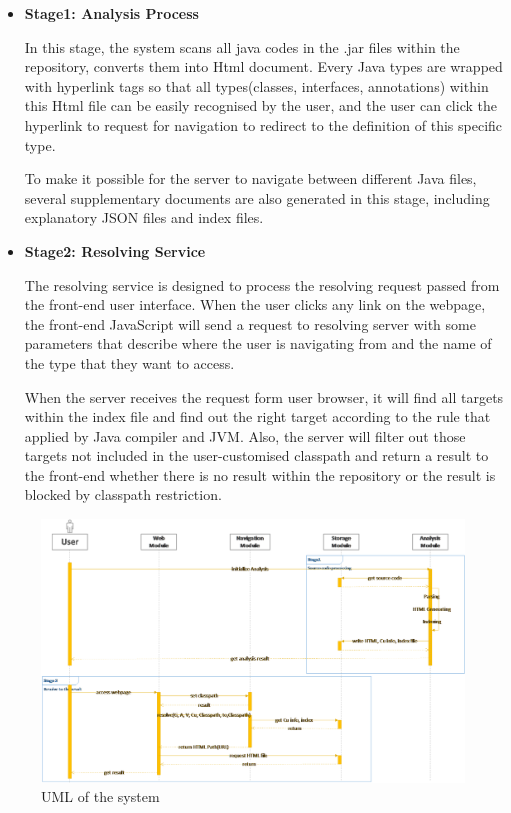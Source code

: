\documentclass[runningheads]{llncs}
\begin{document}
\begin{itemize}
	\item \textbf{Stage1: Analysis Process}

	In this stage, the system scans all java codes in the .jar files within the repository, converts them into Html document. Every Java types are wrapped with hyperlink tags so that all types(classes, interfaces, annotations) within this Html file can be easily recognised by the user, and the user can click the hyperlink to request for navigation to redirect to the definition of this specific type.

	To make it possible for the server to navigate between different Java files, several supplementary documents are also generated in this stage, including explanatory JSON files and index files.
	

	\item \textbf{Stage2: Resolving Service}

	The resolving service is designed to process the resolving request passed from the front-end user interface. When the user clicks any link on the webpage, the front-end JavaScript will send a request to resolving server with some parameters that describe where the user is navigating from and the name of the type that they want to access.

	When the server receives the request form user browser, it will find all targets within the index file and find out the right target according to the rule that applied by Java compiler and JVM. Also, the server will filter out those targets not included in the user-customised classpath and return a result to the front-end whether there is no result within the repository or the result is blocked by classpath restriction.
\end{itemize}


\begin{figure}[H]
	\centering
	\includegraphics[width=12cm]{pic/system-uml.png}
	\caption{UML of the system}
	\label{UML of the system}
\end{figure}
\end{document}
